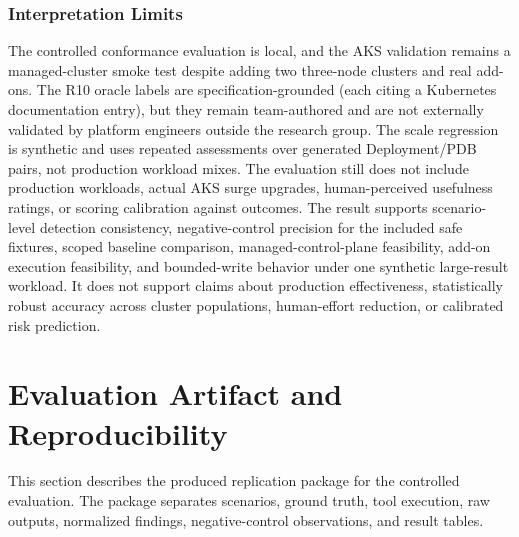 \documentclass[10pt,journal]{IEEEtran}
\begin{document}
\subsubsection*{Interpretation Limits}
The controlled conformance evaluation is local, and the AKS validation remains a managed-cluster smoke test despite adding two three-node clusters and real add-ons. The R10 oracle labels are specification-grounded (each citing a Kubernetes documentation entry), but they remain team-authored and are not externally validated by platform engineers outside the research group. The scale regression is synthetic and uses repeated assessments over generated Deployment/PDB pairs, not production workload mixes. The evaluation still does not include production workloads, actual AKS surge upgrades, human-perceived usefulness ratings, or scoring calibration against outcomes. The result supports scenario-level detection consistency, negative-control precision for the included safe fixtures, scoped baseline comparison, managed-control-plane feasibility, add-on execution feasibility, and bounded-write behavior under one synthetic large-result workload. It does not support claims about production effectiveness, statistically robust accuracy across cluster populations, human-effort reduction, or calibrated risk prediction.

\section{Evaluation Artifact and Reproducibility}
\label{sec:benchmark-artifact}
This section describes the produced replication package for the controlled evaluation. The package separates scenarios, ground truth, tool execution, raw outputs, normalized findings, negative-control observations, and result tables.
\end{document}
